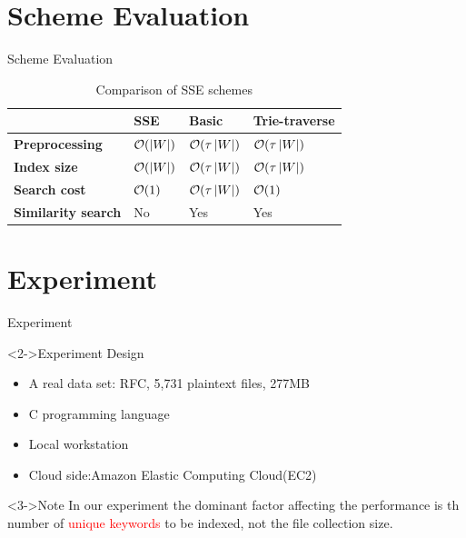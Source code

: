 \documentclass[handout]{beamer}
\begin{document}
\section{Scheme Evaluation}

\begin{frame}{Scheme Evaluation}
	\begin{table}
		\begin{tabular}{l l l l}
			\toprule
			{} & \textbf{SSE} & \textbf{Basic} & \textbf{Trie-traverse}\\
			\midrule
			 \textbf{Preprocessing} & ${\cal O}(\left| W \right|)$ & ${\cal O}(\tau \left| W \right|)$ & ${\cal O}(\tau \left| W \right|)$ \\
			 \textbf{Index size} & ${\cal O}(\left| W \right|)$ & ${\cal O}(\tau \left| W \right|)$ & ${\cal O}(\tau \left| W \right|)$ \\
			 \textbf{Search cost} & ${\cal O}(1)$ & ${\cal O}(\tau \left| W \right|)$ & \textcolor{red}{${\cal O}(1)$}  \\
			 \textbf{Similarity search} & No & Yes & Yes \\
			\bottomrule
		\end{tabular}
		\caption{Comparison of SSE schemes}
	\end{table}

\end{frame}

\section{Experiment}

\begin{frame}{Experiment}
		\begin{block}<2->{Experiment Design}
			\begin{itemize}
				\item A real data set: RFC, 5,731 plaintext files, 277MB
				\item C programming language 
				\item Local workstation
				\item Cloud side:Amazon Elastic Computing Cloud(EC2)
			\end{itemize}
		\end{block}
		\begin{exampleblock}<3->{Note}
			In our experiment the dominant factor affecting the performance is th number of \textcolor{red}{unique keywords} to be indexed, not the \textcolor[rgb]{0.1,0.7,0.2}{file collection size}.
		\end{exampleblock}
\end{frame}
\end{document}
